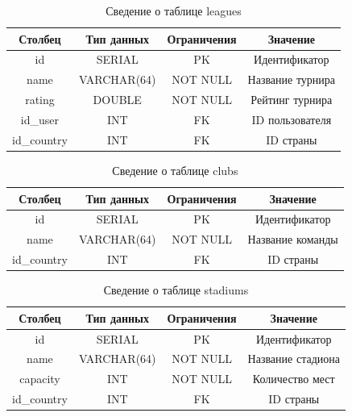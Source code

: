 \begin{table}[H]
	\begin{center}
		\caption{Сведение о таблице leagues}
		\begin{tabular}{|c|c|c|c|}
			\hline
			Столбец & Тип данных & Ограничения & Значение \\
			\hline
			id & SERIAL & PK & Идентификатор \\
			\hline
			name & VARCHAR(64) & NOT NULL & Название турнира \\
			\hline
			rating & DOUBLE & NOT NULL & Рейтинг турнира\\
			\hline
			id\_user & INT & FK &  ID пользователя \\
			\hline
			id\_country & INT & FK & ID страны \\
			\hline
		\end{tabular}
		\label{table:db:league}
	\end{center}
\end{table}

\begin{table}[H]
	\begin{center}
		\caption{Сведение о таблице clubs}
		\begin{tabular}{|c|c|c|c|}
			\hline
			Столбец & Тип данных & Ограничения & Значение \\
			\hline
			id & SERIAL & PK & Идентификатор \\
			\hline
			name & VARCHAR(64) & NOT NULL & Название команды \\
			\hline
			id\_country & INT & FK & ID страны \\
			\hline
		\end{tabular}
		\label{table:db:club}
	\end{center}
\end{table}

\begin{table}[H]
	\begin{center}
		\caption{Сведение о таблице stadiums}
		\begin{tabular}{|c|c|c|c|}
			\hline
			Столбец & Тип данных & Ограничения & Значение \\
			\hline
			id & SERIAL & PK & Идентификатор \\
			\hline
			name & VARCHAR(64) & NOT NULL & Название стадиона \\
			\hline
			capacity & INT & NOT NULL & Количество мест \\
			\hline
			id\_country & INT & FK & ID страны \\
			\hline
		\end{tabular}
		\label{table:db:stadium}
	\end{center}
\end{table}

